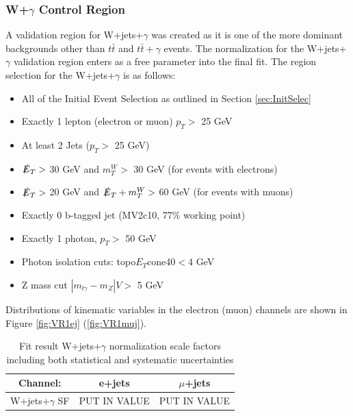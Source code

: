 \subsubsection{W+$\gamma$ Control Region}
A validation region for W+jets+$\gamma$ was created as it is one of the more dominant backgrounds other than $t\bar{t}$ and $t\bar{t}+\gamma$ events.  The normalization for the W+jets+$\gamma$ validation region enters as a free parameter into the final fit. The region selection for the W+jets+$\gamma$ is as follows:
\begin{itemize}
\item All of the Initial Event Selection as outlined in Section \ref{sec:InitSelec}
\item Exactly 1 lepton (electron or muon) $p_T >$ 25 GeV
\item At least 2 Jets  ($p_T >$ 25 GeV) 
\item $\slashed{E}_T >$ 30 GeV and $m_T^W >$ 30 GeV (for events with electrons)
\item $\slashed{E}_T >$ 20 GeV and $\slashed{E}_T + m_T^W >$ 60 GeV (for events with muons)
\item Exactly 0 b-tagged jet (MV2c10, 77\% working point)
\item Exactly 1 photon, $p_T >$ 50 GeV
\item Photon isolation cuts: topo$E_T$cone40$<$4 GeV
\item Z mass cut $|m_{l\gamma}-m_Z|V>$ 5 GeV
\end{itemize}

Distributions of kinematic variables in the electron (muon) channels are shown in Figure \ref{fig:VR1ej} (\ref{fig:VR1muj}).
\begin{table}[h]
\begin{center}
{\renewcommand{\arraystretch}{1.2}
\begin{tabular}{c|c|c}
\hline
Channel:     &  e+jets   & $\mu$+jets  \\  \hline 
W+jets+$\gamma$ SF    &  PUT IN VALUE   & PUT IN VALUE	\\ \hline  %
\end{tabular}
\caption{Fit result W+jets+$\gamma$ normalization scale factors including both statistical and systematic uncertainties}
\label{tab:VR1SFs} 
}
\end{center}
\end{table}

